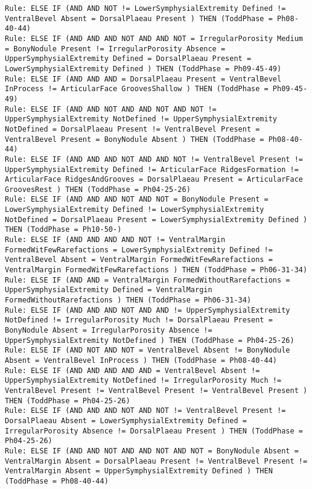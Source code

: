 \begin{lstlisting}
Rule: ELSE IF (AND AND NOT != LowerSymphysialExtremity Defined != VentralBevel Absent = DorsalPlaeau Present ) THEN (ToddPhase = Ph08-40-44)
Rule: ELSE IF (AND AND AND NOT AND AND NOT = IrregularPorosity Medium = BonyNodule Present != IrregularPorosity Absence = UpperSymphysialExtremity Defined = DorsalPlaeau Present = LowerSymphysialExtremity Defined ) THEN (ToddPhase = Ph09-45-49)
Rule: ELSE IF (AND AND AND = DorsalPlaeau Present = VentralBevel InProcess != ArticularFace GroovesShallow ) THEN (ToddPhase = Ph09-45-49)
Rule: ELSE IF (AND AND NOT AND AND NOT AND NOT != UpperSymphysialExtremity NotDefined != UpperSymphysialExtremity NotDefined = DorsalPlaeau Present != VentralBevel Present = VentralBevel Present = BonyNodule Absent ) THEN (ToddPhase = Ph08-40-44)
Rule: ELSE IF (AND AND AND NOT AND AND NOT != VentralBevel Present != UpperSymphysialExtremity Defined != ArticularFace RidgesFormation != ArticularFace RidgesAndGrooves = DorsalPlaeau Present = ArticularFace GroovesRest ) THEN (ToddPhase = Ph04-25-26)
Rule: ELSE IF (AND AND AND NOT AND NOT = BonyNodule Present = LowerSymphysialExtremity Defined != LowerSymphysialExtremity NotDefined = DorsalPlaeau Present = LowerSymphysialExtremity Defined ) THEN (ToddPhase = Ph10-50-)
Rule: ELSE IF (AND AND AND AND NOT != VentralMargin FormedWitFewRarefactions = LowerSymphysialExtremity Defined != VentralBevel Absent = VentralMargin FormedWitFewRarefactions = VentralMargin FormedWitFewRarefactions ) THEN (ToddPhase = Ph06-31-34)
Rule: ELSE IF (AND AND = VentralMargin FormedWithoutRarefactions = UpperSymphysialExtremity Defined = VentralMargin FormedWithoutRarefactions ) THEN (ToddPhase = Ph06-31-34)
Rule: ELSE IF (AND AND AND NOT AND AND != UpperSymphysialExtremity NotDefined != IrregularPorosity Much != DorsalPlaeau Present = BonyNodule Absent = IrregularPorosity Absence != UpperSymphysialExtremity NotDefined ) THEN (ToddPhase = Ph04-25-26)
Rule: ELSE IF (AND NOT AND NOT = VentralBevel Absent != BonyNodule Absent = VentralBevel InProcess ) THEN (ToddPhase = Ph08-40-44)
Rule: ELSE IF (AND AND AND AND AND = VentralBevel Absent != UpperSymphysialExtremity NotDefined != IrregularPorosity Much != VentralBevel Present != VentralBevel Present != VentralBevel Present ) THEN (ToddPhase = Ph04-25-26)
Rule: ELSE IF (AND AND AND NOT AND NOT != VentralBevel Present != DorsalPlaeau Absent = LowerSymphysialExtremity Defined = IrregularPorosity Absence != DorsalPlaeau Present ) THEN (ToddPhase = Ph04-25-26)
Rule: ELSE IF (AND AND NOT AND AND NOT AND NOT = BonyNodule Absent = VentralMargin Absent = DorsalPlaeau Present != VentralBevel Present != VentralMargin Absent = UpperSymphysialExtremity Defined ) THEN (ToddPhase = Ph08-40-44)

\end{lstlisting}
